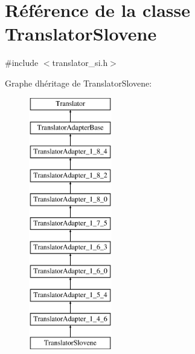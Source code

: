 \hypertarget{class_translator_slovene}{}\section{Référence de la classe Translator\+Slovene}
\label{class_translator_slovene}


{\ttfamily \#include $<$translator\+\_\+si.\+h$>$}

Graphe d\textquotesingle{}héritage de Translator\+Slovene\+:\begin{figure}[H]
\begin{center}
\leavevmode
\includegraphics[height=11.000000cm]{class_translator_slovene}
\end{center}
\end{figure}
